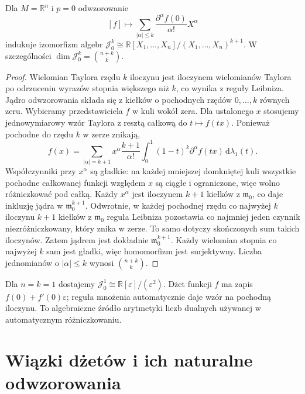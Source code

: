 \begin{twierdzenie}
\label{thm:dzety-algebra}
Dla $M=\mathbb R^n$ i $p=0$ odwzorowanie
\[
 [f]\longmapsto \sum_{|\alpha|\le k}
 \frac{\partial^\alpha f(0)}{\alpha!}X^\alpha
\]
indukuje izomorfizm algebr
$\mathcal J_0^k\cong\mathbb R[X_1,\ldots,X_n]/(X_1,\ldots,X_n)^{k+1}$.
W szczególności $\dim\mathcal J_0^k=\binom{n+k}{k}$.
\end{twierdzenie}
\begin{proof}
Wielomian Taylora rzędu $k$ iloczynu jest iloczynem
wielomianów Taylora po odrzuceniu wyrazów stopnia większego niż $k$,
co wynika z reguły Leibniza. Jądro odwzorowania składa się
z kiełków o pochodnych rzędów $0,\ldots,k$ równych zeru.
Wybieramy przedstawiciela $f$ w kuli wokół zera.
Dla ustalonego $x$ stosujemy jednowymiarowy wzór
Taylora z resztą całkową do $t\mapsto f(tx)$.
Ponieważ pochodne do rzędu $k$ w zerze znikają,
\[
 f(x)=\sum_{|\alpha|=k+1}x^\alpha
 \frac{k+1}{\alpha!}\int_0^1(1-t)^k
 \partial^\alpha f(tx)\,\mathrm d\lambda_1(t).
\]
Współczynniki przy $x^\alpha$ są gładkie:
na każdej mniejszej domkniętej kuli wszystkie
pochodne całkowanej funkcji względem $x$ są
ciągłe i ograniczone, więc wolno różniczkować
pod całką. Każdy $x^\alpha$ jest iloczynem $k+1$
kiełków z $\mathfrak m_0$, co daje inkluzję
jądra w $\mathfrak m_0^{k+1}$.
Odwrotnie, w każdej pochodnej rzędu co najwyżej $k$
iloczynu $k+1$ kiełków z $\mathfrak m_0$ reguła
Leibniza pozostawia co najmniej jeden czynnik
niezróżniczkowany, który znika w zerze.
To samo dotyczy skończonych sum takich iloczynów.
Zatem jądrem jest dokładnie $\mathfrak m_0^{k+1}$.
Każdy wielomian stopnia co najwyżej $k$ sam jest gładki,
więc homomorfizm jest surjektywny. Liczba jednomianów
o $|\alpha|\le k$ wynosi $\binom{n+k}{k}$.
\end{proof}

\begin{przyklad}
\label{ex:dzety-dualne}
Dla $n=k=1$ dostajemy
$\mathcal J_0^1\cong\mathbb R[\varepsilon]/(\varepsilon^2)$.
Dżet funkcji $f$ ma zapis $f(0)+f'(0)\varepsilon$;
reguła mnożenia automatycznie daje wzór na pochodną iloczynu.
To algebraiczne źródło arytmetyki liczb dualnych używanej
w automatycznym różniczkowaniu.
\end{przyklad}

\section{Wiązki dżetów i ich naturalne odwzorowania}

